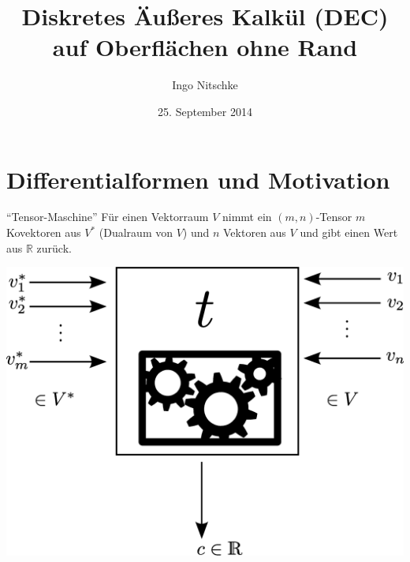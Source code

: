 \documentclass[handout]{beamer}
\title[DEC]{Diskretes Äußeres Kalkül (DEC)\\auf Oberflächen ohne Rand}
\author{Ingo Nitschke}
\institute{IWR - TU Dresden}
\date{25. September 2014}
\newcommand{\R}{\mathds{R}}
\begin{document}
 \frame{ \titlepage }

  
\section{Differentialformen und Motivation}

  \begin{frame}
    \begin{block}{"`Tensor-Maschine"'}
      Für einen Vektorraum \( V \) nimmt ein \( (m,n) \)-Tensor \( m \) Kovektoren aus \( V^{*} \)
      (Dualraum von \( V \)) und \( n \) Vektoren aus \( V \) und gibt einen Wert aus \( \R \) zurück.

      \hfill\includegraphics[height=0.7\textheight]{bilder/tensormaschine/Tensor.eps}\phantom{qwertz}
    \end{block}
  \end{frame}
\end{document}
